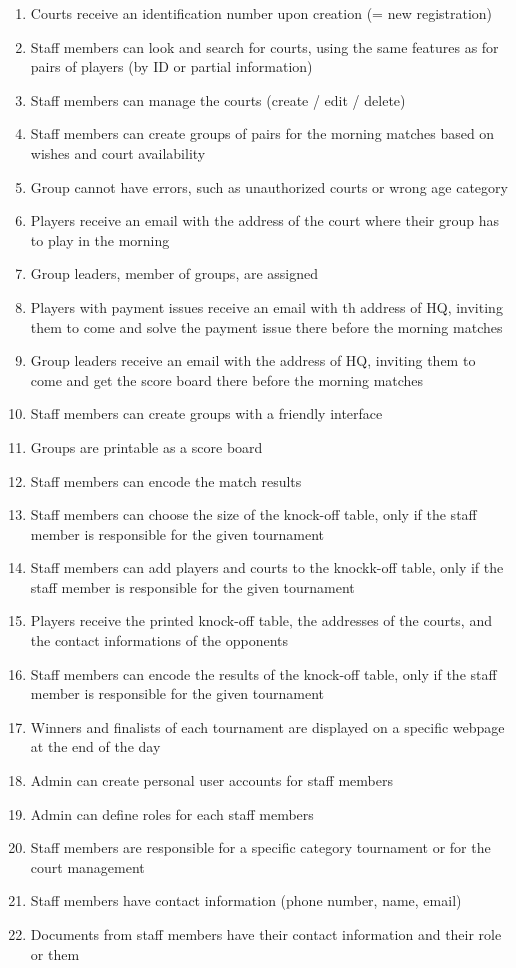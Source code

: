 \begin{enumerate}
    \item Courts receive an identification number upon creation (= new
        registration)
    \item Staff members can look and search for courts, using the same
        features as for pairs of players (by ID or partial information)
    \item Staff members can manage the courts (create / edit / delete)
    \item Staff members can create groups of pairs for the morning
        matches based on wishes and court availability
    \item Group cannot have errors, such as unauthorized courts or wrong
        age category
    \item Players receive an email with the address of the court where
        their group has to play in the morning
    \item Group leaders, member of groups, are assigned
    \item Players with payment issues receive an email with th address
        of HQ, inviting them to come and solve the payment issue there
        before the morning matches
    \item Group leaders receive an email with the address of HQ,
        inviting them to come and get the score board there before the
        morning matches
    \item Staff members can create groups with a friendly interface
    \item Groups are printable as a score board
    \item Staff members can encode the match results
    \item Staff members can choose the size of the knock-off table, only
        if the staff member is responsible for the given tournament
    \item Staff members can add players and courts to the knockk-off
        table, only if the staff member is responsible for the given
        tournament
    \item Players receive the printed knock-off table, the addresses of
        the courts, and the contact informations of the opponents
    \item Staff members can encode the results of the knock-off table,
        only if the staff member is responsible for the given tournament
    \item Winners and finalists of each tournament are displayed on a
        specific webpage at the end of the day
    \item Admin can create personal user accounts for staff members
    \item Admin can define roles for each staff members
    \item Staff members are responsible for a specific category
        tournament or for the court management 
    \item Staff members have contact information (phone number, name,
        email)
    \item Documents from staff members have their contact information
        and their role or them
\end{enumerate}

